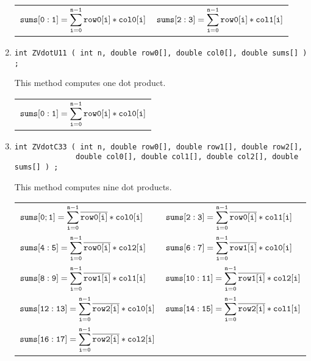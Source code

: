 \begin{enumerate}
\begin{tabular}{ll}
$\displaystyle{\tt sums[0:1]}
               = \sum_{\tt i = 0}^{\tt n-1} {\tt row0[i] * col0[i]}$ &
$\displaystyle{\tt sums[2:3]}
               = \sum_{\tt i = 0}^{\tt n-1} {\tt row0[i] * col1[i]}$ 
\end{tabular}
\item
\begin{verbatim}
int ZVdotU11 ( int n, double row0[], double col0[], double sums[] ) ;
\end{verbatim}
This method computes one dot product.
\par
\begin{tabular}{l}
$\displaystyle{\tt sums[0:1]}
               = \sum_{\tt i = 0}^{\tt n-1} {\tt row0[i] * col0[i]}$
\end{tabular}
\item
\begin{verbatim}
int ZVdotC33 ( int n, double row0[], double row1[], double row2[], 
              double col0[], double col1[], double col2[], double sums[] ) ;
\end{verbatim}
This method computes nine dot products.
\par
\begin{tabular}{ll}
$\displaystyle{\tt sums[0;1]}
= \sum_{\tt i = 0}^{\tt n-1} \overline{\tt row0[i]} * {\tt col0[i]}$ &
$\displaystyle{\tt sums[2:3]}
= \sum_{\tt i = 0}^{\tt n-1} \overline{\tt row0[i]} * {\tt col1[i]}$ \\
$\displaystyle{\tt sums[4:5]}
= \sum_{\tt i = 0}^{\tt n-1} \overline{\tt row0[i]} * {\tt col2[i]}$ &
$\displaystyle{\tt sums[6:7]}
= \sum_{\tt i = 0}^{\tt n-1} \overline{\tt row1[i]} * {\tt col0[i]}$ \\
$\displaystyle{\tt sums[8:9]}
= \sum_{\tt i = 0}^{\tt n-1} \overline{\tt row1[i]} * {\tt col1[i]}$ &
$\displaystyle{\tt sums[10:11]}
= \sum_{\tt i = 0}^{\tt n-1} \overline{\tt row1[i]} * {\tt col2[i]}$ \\
$\displaystyle{\tt sums[12:13]}
= \sum_{\tt i = 0}^{\tt n-1} \overline{\tt row2[i]} * {\tt col0[i]}$ &
$\displaystyle{\tt sums[14:15]}
= \sum_{\tt i = 0}^{\tt n-1} \overline{\tt row2[i]} * {\tt col1[i]}$ \\
$\displaystyle{\tt sums[16:17]}
= \sum_{\tt i = 0}^{\tt n-1} \overline{\tt row2[i]} * {\tt col2[i]}$ 
\end{tabular}

\end{enumerate}
